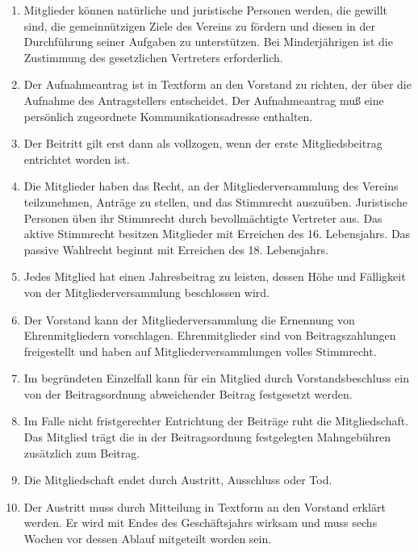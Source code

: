 \documentclass[12pt,a4paper]{article}
\begin{document}
\begin{enumerate}
\item Mitglieder können natürliche und juristische Personen werden, die gewillt sind, die gemeinnützigen Ziele des Vereins zu fördern und diesen in der Durchführung seiner Aufgaben zu unterstützen. Bei Minderjährigen ist die Zustimmung des gesetzlichen Vertreters erforderlich.
\item Der Aufnahmeantrag ist in Textform an den Vorstand zu richten, der über die Aufnahme des Antragstellers entscheidet. Der Aufnahmeantrag muß eine persönlich zugeordnete Kommunikationsadresse enthalten. 
\item Der Beitritt gilt erst dann als vollzogen, wenn der erste Mitgliedsbeitrag entrichtet worden ist.
\item Die Mitglieder haben das Recht, an der Mitgliederversammlung des Vereins teilzunehmen, Anträge zu stellen, und das Stimmrecht auszuüben. Juristische Personen üben ihr Stimmrecht durch bevollmächtigte Vertreter aus. Das aktive Stimmrecht besitzen Mitglieder mit Erreichen des 16. Lebensjahrs. Das passive Wahlrecht beginnt mit Erreichen des 18. Lebensjahrs.
\item Jedes Mitglied hat einen Jahresbeitrag zu leisten, dessen Höhe und Fälligkeit von der Mitgliederversammlung beschlossen wird.
\item Der Vorstand kann der Mitgliederversammlung die Ernennung von Ehrenmitgliedern vorschlagen. Ehrenmitglieder sind von Beitragszahlungen freigestellt und haben auf Mitgliederversammlungen volles Stimmrecht.
\item Im begründeten Einzelfall kann für ein Mitglied durch Vorstandsbeschluss ein von der Beitragsordnung abweichender Beitrag festgesetzt werden.
\item Im Falle nicht fristgerechter Entrichtung der Beiträge ruht die Mitgliedschaft. Das Mitglied trägt die in der Beitragsordnung festgelegten Mahngebühren zusätzlich zum Beitrag.
\item Die Mitgliedschaft endet durch Austritt, Ausschluss oder Tod.
\item Der Austritt muss durch Mitteilung in Textform an den Vorstand erklärt werden. Er wird mit Endes des Geschäftsjahrs wirksam und muss sechs Wochen vor dessen Ablauf mitgeteilt worden sein.

\end{enumerate}
\end{document}
